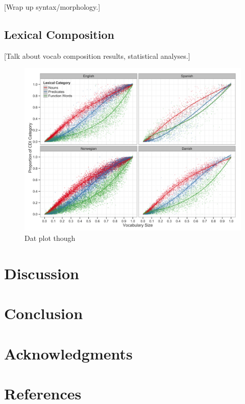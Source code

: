 \documentclass[10pt,letterpaper]{article}
\begin{document}
[Wrap up syntax/morphology.]

\clearpage

\subsection{Lexical Composition}

[Talk about vocab composition results, statistical analyses.]

\begin{figure}[!ht]
\begin{center}
\includegraphics[scale=1]{plots/composition.png}
\end{center}
\caption{Dat plot though} 
\label{age_composition}
\end{figure}

\clearpage

\section{Discussion}

\section{Conclusion}

\section{Acknowledgments}

\clearpage

\section{References}



\setlength{\bibleftmargin}{.125in}
\setlength{\bibindent}{-\bibleftmargin}


\end{document}
